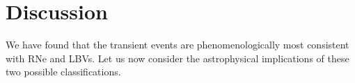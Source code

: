 \section{Discussion}
\label{sec:Discussion}

We have found that the \spock transient events are phenomenologically
most consistent with RNe and LBVs.  Let us now consider
the astrophysical implications of these two possible classifications.


